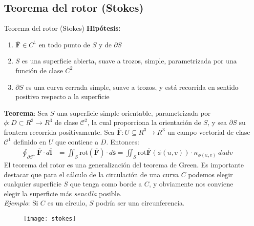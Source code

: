 \documentclass[a4paper, twoside]{article}
\numberwithin{equation}{section}
\numberwithin{figure}{section}
\numberwithin{table}{section}
\newcommand{\vect}[1]{\overline{\textbf{#1}}}
\begin{document}
\subsection{Teorema del rotor (Stokes)}
\begin{minipage}{0.75\textwidth}
	\begin{teorema*}[0.9\textwidth]{Teorema del rotor (Stokes)}
		\textbf{Hipótesis:}
		\begin{enumerate}
			\item $\vect{F}\in C^1$ en todo punto de $S$ y de $\partial S$
			\item $S$ es una superficie abierta, suave a trozos, simple, parametrizada por una función de clase $C^2$
			\item $\partial S$ es una curva cerrada simple, suave a trozos, y está recorrida en sentido positivo respecto a la superficie
		\end{enumerate}

		\textbf{Teorema}: Sea $S$ una superficie simple orientable, parametrizada por $\phi: D \subset R^3 \to R^3$ de clase $\mathcal{C}^2$, la cual proporciona la orientación de $S$, y sea $\partial S$ su frontera recorrida positivamente. Sea $\vect{F}: U \subseteq R^3 \to R^3$ un campo vectorial de clase $\mathcal{C}^1$ definido en $U$ que contiene a $D$. Entonces:
		\begin{align}
			\oint_{\partial S^{+}} \vect{F} \cdot d\vect{l} & = \iint_{S} \text{rot}(\vect{F}) \cdot d\vect{s} = \iint_{S} \text{rot} \vect{F}(\phi(u,v)) \cdot n_{\phi(u,v)}\: dudv
		\end{align}
		El teorema del rotor es una generalización del teorema de Green. Es importante destacar que para el cálculo de la circulación de una curva $C$ podemos elegir cualquier superficie $S$ que tenga como borde a $C$, y obviamente nos conviene elegir la superficie más \emph{sencilla} posible.\\
		
		\emph{Ejemplo}: Si $C$ es un círculo, $S$ podría ser una circunferencia.
	\end{teorema*}
\end{minipage}
\begin{minipage}{0.2\textwidth}
	\begin{figure}[H]
		\texttt{[image: stokes]}
	\end{figure}
\end{minipage}
\end{document}
